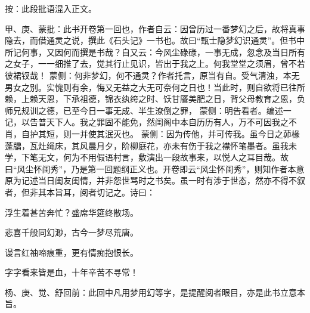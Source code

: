 
\begin{parag}
    \begin{note} \begin{subnote} 按：此段批语混入正文。\end{subnote}
        甲、庚、蒙批：此书开卷第一回也，作者自云：因曾历过一番梦幻之后，故将真事隐去，而借通灵之说，撰此《石头记》一书也。故曰“甄士隐梦幻识通灵”。但书中所记何事，又因何而撰是书哉？自又云：今风尘碌碌，一事无成，忽念及当日所有之女子，一一细推了去，觉其行止见识，皆出于我之上。何我堂堂之须眉，曾不若彼裙钗哉！ 蒙侧：何非梦幻，何不通灵？作者托言，原当有自。受气清浊，本无男女之别。实愧则有余，悔又无益之大无可奈何之日也！当此时，则自欲将已往所赖，上赖天恩，下承祖德，锦衣纨绔之时、饫甘餍美肥之日，背父母教育之恩，负师兄规训之德，已至今日一事无成、半生潦倒之罪， 蒙侧：明告看者。编述一记，以告普天下人。我之罪固不能免，然闺阁中本自历历有人，万不可因我之不肖，自护其短，则一并使其泯灭也。 蒙侧：因为传他，并可传我。虽今日之茆椽蓬牖，瓦灶绳床，其风晨月夕，阶柳庭花，亦未有伤于我之襟怀笔墨者。虽我未学，下笔无文，何为不用假语村言，敷演出一段故事来，以悦人之耳目哉。故曰“风尘怀闺秀”，乃是第一回题纲正义也。开卷即云“风尘怀闺秀”，则知作者本意原为记述当日闺友闺情，并非怨世骂时之书矣。虽一时有涉于世态，然亦不得不叙者，但非其本旨耳，阅者切记之。诗曰：
    \end{note}



    \begin{poem}
        \color{Mahogany}
        \begin{pl}浮生着甚苦奔忙？盛席华筵终散场。\end{pl}

        \begin{pl}悲喜千般同幻渺，古今一梦尽荒唐。\end{pl}

        \begin{pl}谩言红袖啼痕重，更有情痴抱恨长。\end{pl}

        \begin{pl}字字看来皆是血，十年辛苦不寻常！\end{pl}
    \end{poem}

\end{parag}

\begin{parag}
    \begin{note}杨、庚、觉、舒回前：此回中凡用梦用幻等字，是提醒阅者眼目，亦是此书立意本旨。\end{note}

\end{parag}


